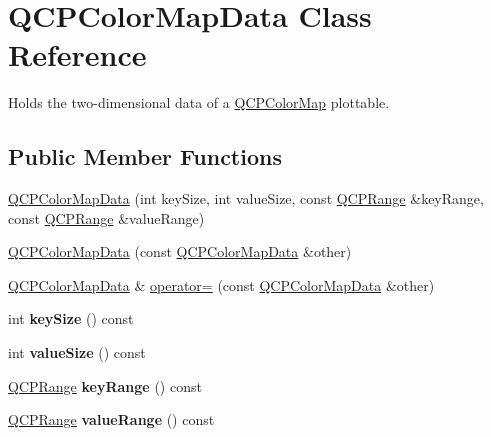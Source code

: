 \hypertarget{classQCPColorMapData}{\section{\-Q\-C\-P\-Color\-Map\-Data \-Class \-Reference}
\label{classQCPColorMapData}
}


\-Holds the two-\/dimensional data of a \hyperlink{classQCPColorMap}{\-Q\-C\-P\-Color\-Map} plottable.  


\subsection*{\-Public \-Member \-Functions}
\begin{DoxyCompactItemize}
\item 
\hyperlink{classQCPColorMapData_aac9d8eb81e18e240d89d56c01933fd23}{\-Q\-C\-P\-Color\-Map\-Data} (int key\-Size, int value\-Size, const \hyperlink{classQCPRange}{\-Q\-C\-P\-Range} \&key\-Range, const \hyperlink{classQCPRange}{\-Q\-C\-P\-Range} \&value\-Range)
\item 
\hyperlink{classQCPColorMapData_a7f2145d86473263494abb9bf1de20436}{\-Q\-C\-P\-Color\-Map\-Data} (const \hyperlink{classQCPColorMapData}{\-Q\-C\-P\-Color\-Map\-Data} \&other)
\item 
\hyperlink{classQCPColorMapData}{\-Q\-C\-P\-Color\-Map\-Data} \& \hyperlink{classQCPColorMapData_afdf4dd1b2f5714234fe84709b85c2a8d}{operator=} (const \hyperlink{classQCPColorMapData}{\-Q\-C\-P\-Color\-Map\-Data} \&other)
\item 
\hypertarget{classQCPColorMapData_aa8d7811686fdfea964947715210c4af8}{int {\bfseries key\-Size} () const }\label{classQCPColorMapData_aa8d7811686fdfea964947715210c4af8}

\item 
\hypertarget{classQCPColorMapData_ab880be6bc587f34e8d22fe77ef6b57e9}{int {\bfseries value\-Size} () const }\label{classQCPColorMapData_ab880be6bc587f34e8d22fe77ef6b57e9}

\item 
\hypertarget{classQCPColorMapData_a4765180639742460f64ab6c97c745c08}{\hyperlink{classQCPRange}{\-Q\-C\-P\-Range} {\bfseries key\-Range} () const }\label{classQCPColorMapData_a4765180639742460f64ab6c97c745c08}

\item 
\hypertarget{classQCPColorMapData_a025be4d7ba0494fd7b38a5a56c737f2a}{\hyperlink{classQCPRange}{\-Q\-C\-P\-Range} {\bfseries value\-Range} () const }\label{classQCPColorMapData_a025be4d7ba0494fd7b38a5a56c737f2a}


\end{DoxyCompactItemize}
